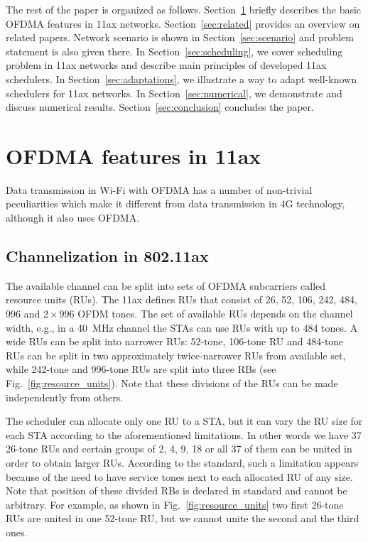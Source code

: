 The rest of the paper is organized as follows.
Section~\ref{sec:features} briefly describes the basic OFDMA features in 11ax networks.
Section~\ref{sec:related} provides an overview on related papers.
Network scenario is shown in Section~\ref{sec:scenario} and problem statement is also given there.
In Section~\ref{sec:scheduling}, we cover scheduling problem in 11ax networks and describe main principles of developed 11ax schedulers.
In Section~\ref{sec:adaptations}, we illustrate a way to adapt well-known schedulers for 11ax networks.
In Section~\ref{sec:numerical}, we demonstrate and discuss numerical results. 
Section~\ref{sec:conclusion} concludes the paper.
\section{OFDMA features in 11ax}
\label{sec:features}

Data transmission in Wi-Fi with OFDMA has a number of non-trivial peculiarities which make it different from data transmission in 4G technology, although it also uses OFDMA.

\subsection{Channelization in 802.11ax}
The available channel can be split into sets of OFDMA subcarriers called resource units (RUs).
The 11ax defines RUs that consist of 26, 52, 106, 242, 484, 996 and $2\times996$ OFDM tones.
The set of available RUs depends on the channel width, e.g., in a \SI{40}{\MHz} channel the STAs can use RUs with up to 484 tones.
A wide RUs can be split into narrower RUs: 52-tone, 106-tone RU and 484-tone RUs can be split in two approximately twice-narrower RUs from available set, while 242-tone and 996-tone RUs are split into three RBs (see Fig.~\ref{fig:resource_units}).
Note that these divisions of the RUs can be made independently from others. 

The scheduler can allocate only one RU to a STA, but it can vary the RU size for each STA according to the aforementioned limitations.
In other words we have 37 26-tone RUs and certain groups of 2, 4, 9, 18 or all 37 of them can be united in order to obtain larger RUs.
According to the standard, such a limitation appears because of the need to have service tones next to each allocated RU of any size. 
Note that position of these divided RBs is declared in standard and cannot be arbitrary.
For example, as shown in Fig.~\ref{fig:resource_units} two first 26-tone RUs are united in one 52-tone RU, but we cannot unite the second and the third ones.


